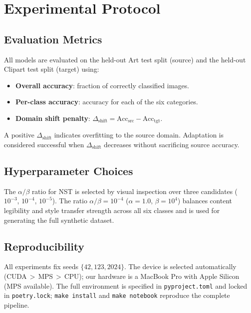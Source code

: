 \documentclass[conference]{IEEEtran}
\begin{document}
\section{Experimental Protocol}
\label{sec:experiments}

\subsection{Evaluation Metrics}

All models are evaluated on the held-out Art test split (source) and the held-out
Clipart test split (target) using:

\begin{itemize}
  \item \textbf{Overall accuracy}: fraction of correctly classified images.
  \item \textbf{Per-class accuracy}: accuracy for each of the six categories.
  \item \textbf{Domain shift penalty}: $\Delta_{\text{shift}} = \text{Acc}_{\text{src}} - \text{Acc}_{\text{tgt}}$.
\end{itemize}

A positive $\Delta_{\text{shift}}$ indicates overfitting to the source domain.
Adaptation is considered successful when $\Delta_{\text{shift}}$ decreases without
sacrificing source accuracy.

\subsection{Hyperparameter Choices}

The $\alpha/\beta$ ratio for NST is selected by visual inspection over three candidates
($10^{-3}$, $10^{-4}$, $10^{-5}$).
The ratio $\alpha/\beta = 10^{-4}$ ($\alpha = 1.0$, $\beta = 10^4$) balances content
legibility and style transfer strength across all six classes and is used for
generating the full synthetic dataset.

\subsection{Reproducibility}

All experiments fix seeds $\{42, 123, 2024\}$.
The device is selected automatically (CUDA\,$>$\,MPS\,$>$\,CPU); our hardware is
a MacBook Pro with Apple Silicon (MPS available).
The full environment is specified in \texttt{pyproject.toml} and locked in
\texttt{poetry.lock}; \texttt{make install} and \texttt{make notebook} reproduce
the complete pipeline.
\end{document}

